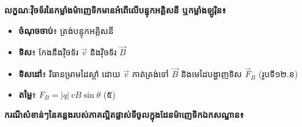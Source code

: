 \vspace{0.7em}
\noindent
\begin{minipage}[t]{0.55\textwidth}
	\raggedright
	\textbf{លក្ខណៈវ៉ិចទ័រនៃកម្លាំងម៉ាញេទិកមានអំពើលើបន្ទុកអគ្គិសនី ឬកម្លាំងឡូរ៉ិន៖}

	\vspace{0.2em}
	\begin{itemize}[itemsep=2pt, topsep=2pt, parsep=0pt, leftmargin=1.6em]
	\item \textbf{ចំណុចចាប់}៖ ត្រង់បន្ទុកអគ្គិសនី
	\item \textbf{ទិស}៖ កែងនឹងវ៉ិចទ័រ $\vec{v}$ និងវ៉ិចទ័រ $\vec{B}$
	\item \textbf{ទិសដៅ}៖ វិធានម្រាមដៃស្តាំ ដោយ $\vec{v}$ កាត់ត្រង់ទៅ $\vec{B}$ និងមេដៃបង្ហាញទិស $\vec{F}_B$ (រូបទី១២.ខ)
	\item \textbf{តម្លៃ}៖ $F_B = |q|\,vB\sin\theta$ \quad (៥)
	\end{itemize}
\end{minipage}%
\hfill
\begin{minipage}[t]{0.40\textwidth}
	\vspace{0pt}
	\hspace*{0.5em}%
\end{minipage}

\vspace{0.7em}
\noindent
\begin{minipage}[b]{0.46\textwidth}
	\vspace{0pt}
\end{minipage}%
\hfill
\begin{minipage}[b]{0.46\textwidth}
	\vspace{0pt}
\end{minipage}

\vspace{0.9em}
\noindent
\textbf{ករណីសំខាន់ៗនៃគន្លងរបស់ភាគល្អិតផ្លាស់ទីចូលក្នុងដែនម៉ាញេទិកឯកសណ្ឋាន៖}

